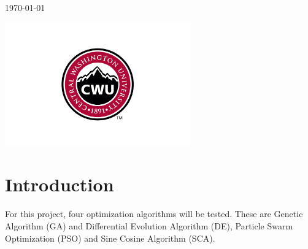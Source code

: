 \documentclass[12pt]{article}
\begin{document}
\begin{titlepage}
        
        \vfill
        
        {\large \today}\\ %
        
        \vfill
        
        \includegraphics[width=8cm]{CWU-Logo.png}\\[.5cm] %
        
        
        \vfill %
        
    \end{titlepage}
    \newpage
    \tableofcontents
    \newpage
    
    
    
    \section{Introduction}
    
    For this project, four optimization algorithms will be tested. These are Genetic Algorithm (GA) and Differential Evolution Algorithm (DE), Particle Swarm Optimization (PSO) and Sine Cosine Algorithm (SCA).
    
\end{document}
